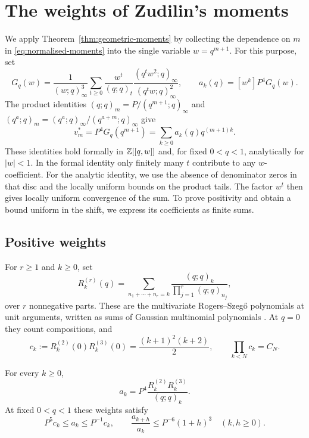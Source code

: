 \documentclass[11pt]{article}
\begin{document}
\section{The weights of Zudilin's moments}\label{sec:weights}

We apply Theorem~\ref{thm:geometric-moments} by collecting the
dependence on $m$ in \eqref{eq:normalised-moments} into the single
variable $w=q^{m+1}$. For this purpose, set
\begin{equation}\label{eq:weight-generating-function}
 G_q(w)=\frac1{(w;q)_\infty^3}
 \sum_{t\ge0}\frac{w^t}{(q;q)_t}
       \frac{(q^tw^2;q)_\infty}{(q^tw;q)_\infty^2},
 \qquad a_k(q)=[w^k]P^4G_q(w).
\end{equation}
The product identities
$(q;q)_m=P/(q^{m+1};q)_\infty$ and
$(q^a;q)_m=(q^a;q)_\infty/(q^{a+m};q)_\infty$
give
\begin{equation}\label{eq:positive-moments}
 v_m^*=P^4G_q(q^{m+1})=\sum_{k\ge0}a_k(q)q^{(m+1)k}.
\end{equation}
These identities hold formally in $\mathbb{Z}[[q,w]]$ and, for fixed $0<q<1$,
analytically for $|w|<1$. In the formal identity only finitely many
$t$ contribute to any $w$-coefficient. For the analytic identity, we use the absence of denominator zeros in
that disc and the locally uniform bounds on the product tails.
The factor $w^t$ then gives locally uniform convergence of the sum.
To prove positivity and obtain a bound uniform in the shift, we
express its coefficients as finite sums.

\subsection{Positive weights}\label{sec:weight-factorisation}

For $r\ge1$ and $k\ge0$, set
\[
 R_k^{(r)}(q)=\sum_{n_1+\cdots+n_r=k}
              \frac{(q;q)_k}{\prod_{j=1}^r(q;q)_{n_j}},
\]
over $r$ nonnegative parts. These are the multivariate Rogers--Szeg\H{o} polynomials at unit
arguments, written as sums of Gaussian multinomial polynomials
\cite{vinroot2010}. At $q=0$ they count compositions, and
\[
 c_k:=R_k^{(2)}(0)R_k^{(3)}(0)=\frac{(k+1)^2(k+2)}2,
 \qquad \prod_{k<N}c_k=C_N.
\]

\begin{samepage}
\begin{proposition}\label{prop:weight-factorisation}
For every $k\ge0$,
\[
 a_k=P^4\frac{R_k^{(2)}R_k^{(3)}}{(q;q)_k}.
\]
At fixed $0<q<1$ these weights satisfy
\[
 P^5c_k\le a_k\le P^{-1}c_k,
 \qquad \frac{a_{k+h}}{a_k}\le P^{-6}(1+h)^3\quad(k,h\ge0).
\]
\end{proposition}
\end{samepage}
\end{document}
